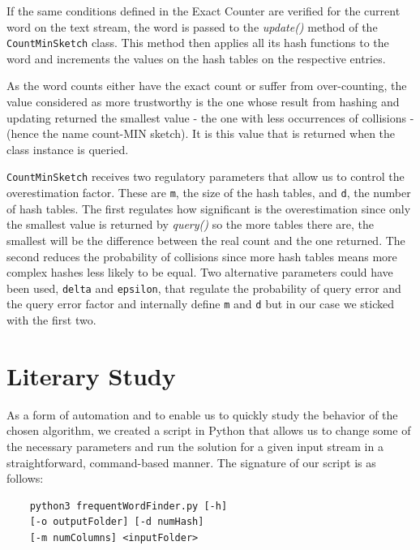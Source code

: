 \documentclass[shortpaper]{revdetua}
\begin{document}
If the same conditions defined in the Exact Counter are verified for the current word on the text stream, the word is passed to the \textit{update()} method of 
the \texttt{CountMinSketch} class.
This method then applies all its hash functions to the word and increments the values on the hash tables on the respective entries.

As the word counts either have the exact count or suffer from over-counting, the value considered as more trustworthy is the one whose result from hashing and 
updating returned the smallest value - the one with less occurrences of collisions - (hence the name count-MIN sketch).
It is this value that is returned when the class instance is queried.

\texttt{CountMinSketch} receives two regulatory parameters that allow us to control the overestimation factor.
These are \texttt{m}, the size of the hash tables, and \texttt{d}, the number of hash tables.
The first regulates how significant is the overestimation since only the smallest value is returned by \textit{query()} so the more tables there are, the 
smallest will be the difference between the real count and the one returned.
The second reduces the probability of collisions since more hash tables means more complex hashes less likely to be equal.
Two alternative parameters could have been used, \texttt{delta} and \texttt{epsilon}, that regulate the probability of query error and the query error factor 
and internally define \texttt{m} and \texttt{d} but in our case we sticked with the first two.

\section{Literary Study} %

As a form of automation and to enable us to quickly study the behavior of the chosen algorithm, we created a script in Python that allows us to change some of 
the necessary parameters and run the solution for a given input stream in a straightforward, command-based manner.
The signature of our script is as follows:

\vspace{-5pt}
\begin{center}
    \begin{verbatim}
    python3 frequentWordFinder.py [-h]
    [-o outputFolder] [-d numHash] 
    [-m numColumns] <inputFolder>
    \end{verbatim}
\end{center}
\vspace{-15pt}
\end{document}
